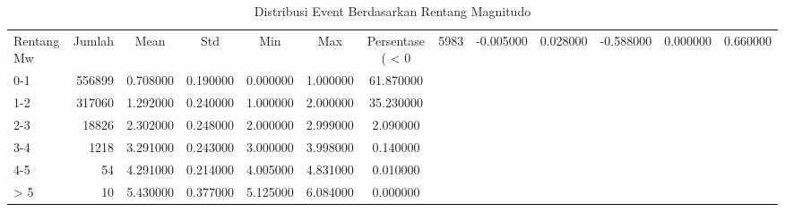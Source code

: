 \begin{table}
\caption{Distribusi Event Berdasarkan Rentang Magnitudo}
\label{tab:magnitude_dist}
\begin{tabular}{|l|r|c|c|c|c|c|}
\toprule
Rentang Mw & Jumlah & Mean & Std & Min & Max & Persentase (%
\midrule
< 0 & 5983 & -0.005000 & 0.028000 & -0.588000 & 0.000000 & 0.660000 \\
0-1 & 556899 & 0.708000 & 0.190000 & 0.000000 & 1.000000 & 61.870000 \\
1-2 & 317060 & 1.292000 & 0.240000 & 1.000000 & 2.000000 & 35.230000 \\
2-3 & 18826 & 2.302000 & 0.248000 & 2.000000 & 2.999000 & 2.090000 \\
3-4 & 1218 & 3.291000 & 0.243000 & 3.000000 & 3.998000 & 0.140000 \\
4-5 & 54 & 4.291000 & 0.214000 & 4.005000 & 4.831000 & 0.010000 \\
> 5 & 10 & 5.430000 & 0.377000 & 5.125000 & 6.084000 & 0.000000 \\
\bottomrule
\end{tabular}
\end{table}
